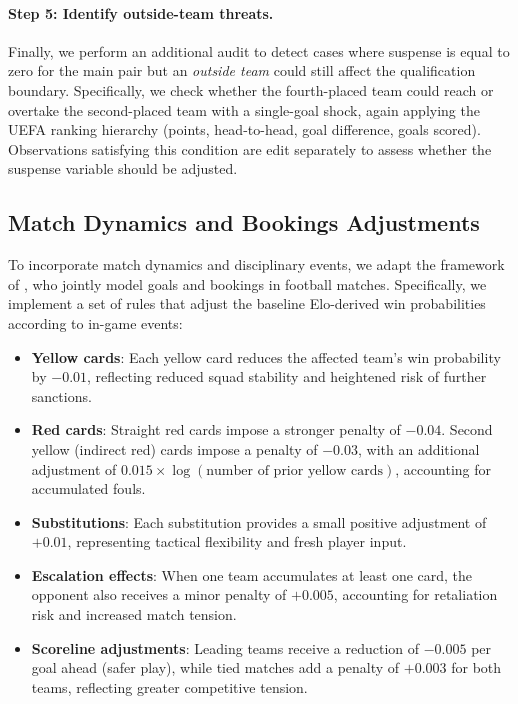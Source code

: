 \documentclass[11pt]{article}
\begin{document}
\paragraph{Step 5: Identify outside-team threats.}
Finally, we perform an additional audit to detect cases where suspense is equal to zero for the main pair but an \emph{outside team} could still affect the qualification boundary. Specifically, we check whether the fourth-placed team could reach or overtake the second-placed team with a single-goal shock, again applying the UEFA ranking hierarchy (points, head-to-head, goal difference, goals scored). Observations satisfying this condition are edit separately to assess whether the suspense variable should be adjusted.

\subsection{Match Dynamics and Bookings Adjustments}
\label{sec: bookings}

To incorporate match dynamics and disciplinary events, we adapt the framework of \citet{titman2015joint}, who jointly model goals and bookings in football matches. Specifically, we implement a set of rules that adjust the baseline Elo-derived win probabilities according to in-game events:

\begin{itemize}
    \item \textbf{Yellow cards}: Each yellow card reduces the affected team's win probability by \(-0.01\), reflecting reduced squad stability and heightened risk of further sanctions.
    \item \textbf{Red cards}: Straight red cards impose a stronger penalty of \(-0.04\). Second yellow (indirect red) cards impose a penalty of \(-0.03\), with an additional adjustment of \(0.015 \times \log(\text{number of prior yellow cards})\), accounting for accumulated fouls.
    \item \textbf{Substitutions}: Each substitution provides a small positive adjustment of \(+0.01\), representing tactical flexibility and fresh player input.
    \item \textbf{Escalation effects}: When one team accumulates at least one card, the opponent also receives a minor penalty of \(+0.005\), accounting for retaliation risk and increased match tension.
    \item \textbf{Scoreline adjustments}: Leading teams receive a reduction of \(-0.005\) per goal ahead (safer play), while tied matches add a penalty of \(+0.003\) for both teams, reflecting greater competitive tension.
\end{itemize}
\end{document}
